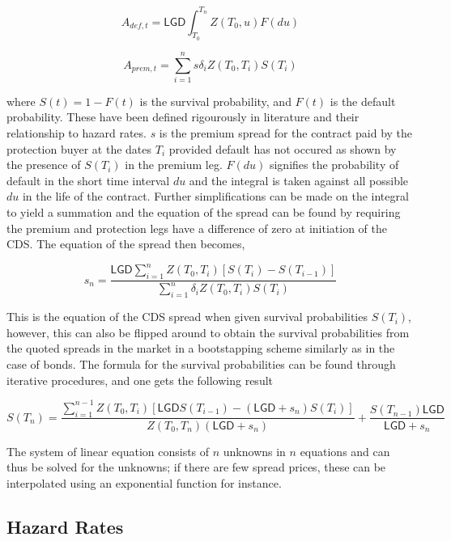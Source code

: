\documentclass[a4paper,12pt]{article}
\begin{document}
\begin{equation}
A_{def, t} = \mathsf{LGD}\int_{T_0}^{T_n}Z(T_0, u)F(du)
\end{equation}

\begin{equation}
A_{prem, t} = \sum_{i = 1}^{n}s\delta_{i}Z(T_0, T_i)S(T_i)
\end{equation}

where $S(t) = 1 - F(t)$ is the survival probability, and $F(t)$ is the default probability. These have been defined rigourously in literature and their relationship to hazard rates. $s$ is the premium spread for the contract paid by the protection buyer at the dates $T_i$ provided default has not occured as shown by the presence of $S(T_i)$ in the premium leg. $F(du)$  signifies the probability of default in the short time interval $du$ and the integral is taken against all possible $du$ in the life of the contract. Further simplifications can be made on the integral to yield a summation and the equation of the spread can be found by requiring the premium and protection legs have a difference of zero at initiation of the CDS. The equation of the spread then becomes, 

\begin{equation}
s_n = \frac{\mathsf{LGD}\sum_{i = 1}^{n}Z(T_0, T_i)[S(T_i) - S(T_{i - 1})]}{\sum_{i = 1}^{n}\delta_{i}Z(T_0, T_i)S(T_i)}
\end{equation}

This is the equation of the CDS spread when given survival probabilities $S(T_i)$, however, this can also be flipped around to obtain the survival probabilities from the quoted spreads in the market in a bootstapping scheme similarly as in the case of bonds. The formula for the survival probabilities can be found through iterative procedures, and one gets the following result

\begin{equation}
S(T_n) = \frac{\sum_{i = 1}^{n - 1}Z(T_0, T_i)[\mathsf{LGD}S(T_{i - 1}) - \left(\mathsf{LGD} + s_n\right)S(T_i)]}{Z(T_0, T_n)\left(\mathsf{LGD} + s_n\right)} + \frac{S(T_{n - 1})\mathsf{LGD}}{\mathsf{LGD} + s_n}
\end{equation}

The system of linear equation consists of $n$ unknowns in $n$ equations and can thus be solved for the unknowns; if there are few spread prices, these can be interpolated using an exponential function for instance.

\subsection{Hazard Rates} 
\end{document}
